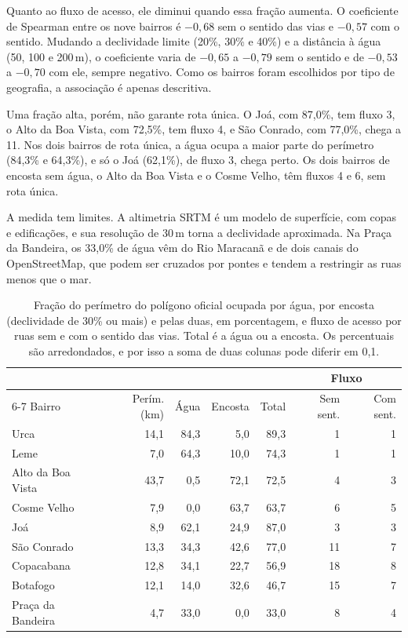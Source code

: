 Quanto ao fluxo de acesso, ele diminui quando essa fração aumenta. O
coeficiente de Spearman entre os nove bairros é $-0{,}68$ sem o sentido das
vias e $-0{,}57$ com o sentido. Mudando a declividade limite (20\%, 30\% e
40\%) e a distância à água (50, 100 e 200\,m), o coeficiente varia de
$-0{,}65$ a $-0{,}79$ sem o sentido e de $-0{,}53$ a $-0{,}70$ com ele, sempre
negativo. Como os bairros foram escolhidos por tipo de geografia, a associação
é apenas descritiva.

Uma fração alta, porém, não garante rota única. O Joá, com 87,0\%, tem fluxo
3, o Alto da Boa Vista, com 72,5\%, tem fluxo 4, e São Conrado, com 77,0\%,
chega a 11. Nos dois bairros de rota única, a água ocupa a maior parte do
perímetro (84,3\% e 64,3\%), e só o Joá (62,1\%), de fluxo 3, chega perto. Os
dois bairros de encosta sem água, o Alto da Boa Vista e o Cosme Velho, têm
fluxos 4 e 6, sem rota única.

A medida tem limites. A altimetria SRTM é um modelo de superfície, com copas e
edificações, e sua resolução de 30\,m torna a declividade aproximada. Na Praça
da Bandeira, os 33,0\% de água vêm do Rio Maracanã e de dois canais do
OpenStreetMap, que podem ser cruzados por pontes e tendem a restringir as ruas
menos que o mar.

\begin{table}[tbp]
\centering
\caption{Fração do perímetro do polígono oficial ocupada por água, por encosta
(declividade de 30\% ou mais) e pelas duas, em porcentagem, e fluxo de acesso
por ruas sem e com o sentido das vias. Total é a água ou a encosta. Os
percentuais são arredondados, e por isso a soma de duas colunas pode diferir em
0,1.}
\label{tab:geo}
\small
\setlength{\tabcolsep}{4pt}
\begin{tabular}{lrrrrrr}
\toprule
 & & & & & \multicolumn{2}{c}{Fluxo} \\
\cmidrule(lr){6-7}
Bairro & Perím. (km) & Água & Encosta & Total & Sem sent. & Com sent. \\
\midrule
Urca              & 14,1 & 84,3 &  5,0 & 89,3 &  1 & 1 \\
Leme              &  7,0 & 64,3 & 10,0 & 74,3 &  1 & 1 \\
Alto da Boa Vista & 43,7 &  0,5 & 72,1 & 72,5 &  4 & 3 \\
Cosme Velho       &  7,9 &  0,0 & 63,7 & 63,7 &  6 & 5 \\
Joá               &  8,9 & 62,1 & 24,9 & 87,0 &  3 & 3 \\
São Conrado       & 13,3 & 34,3 & 42,6 & 77,0 & 11 & 7 \\
Copacabana        & 12,8 & 34,1 & 22,7 & 56,9 & 18 & 8 \\
Botafogo          & 12,1 & 14,0 & 32,6 & 46,7 & 15 & 7 \\
Praça da Bandeira &  4,7 & 33,0 &  0,0 & 33,0 &  8 & 4 \\
\bottomrule
\end{tabular}
\end{table}

